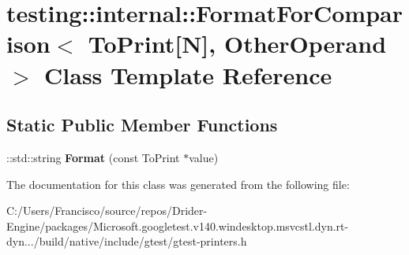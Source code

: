 \hypertarget{classtesting_1_1internal_1_1_format_for_comparison_3_01_to_print[_n]_00_01_other_operand_01_4}{}\section{testing\+:\+:internal\+:\+:Format\+For\+Comparison$<$ To\+Print\mbox{[}N\mbox{]}, Other\+Operand $>$ Class Template Reference}
\label{classtesting_1_1internal_1_1_format_for_comparison_3_01_to_print[_n]_00_01_other_operand_01_4}
\subsection*{Static Public Member Functions}
\begin{DoxyCompactItemize}
\item 
\mbox{\label{classtesting_1_1internal_1_1_format_for_comparison_3_01_to_print[_n]_00_01_other_operand_01_4_a76c526461c8fa7df75f7b32ab889b9e0}} 
\+::std\+::string {\bfseries Format} (const To\+Print $\ast$value)
\end{DoxyCompactItemize}


The documentation for this class was generated from the following file\+:\begin{DoxyCompactItemize}
\item 
C\+:/\+Users/\+Francisco/source/repos/\+Drider-\/\+Engine/packages/\+Microsoft.\+googletest.\+v140.\+windesktop.\+msvcstl.\+dyn.\+rt-\/dyn.../build/native/include/gtest/gtest-\/printers.\+h\end{DoxyCompactItemize}
